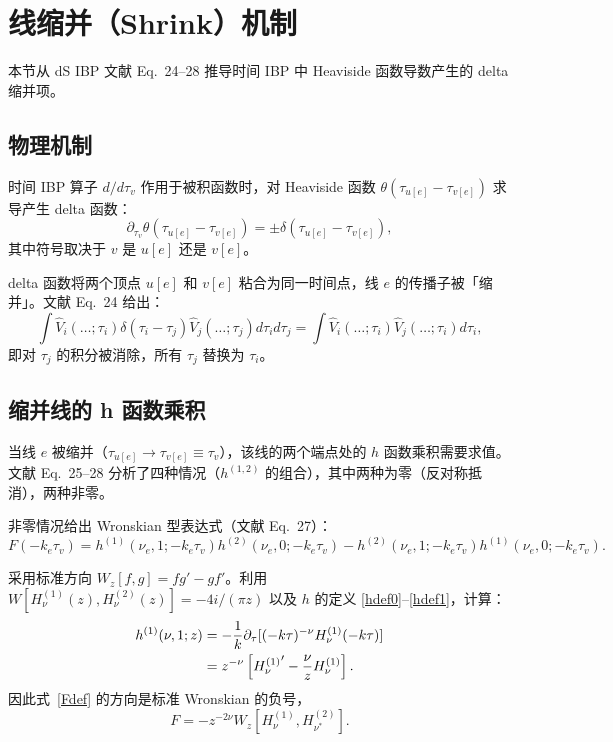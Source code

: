 ﻿\documentclass[a4paper,11pt]{article}
\begin{document}
\section{线缩并（Shrink）机制}

本节从 dS IBP 文献 Eq.~24--28 推导时间 IBP 中 Heaviside 函数导数产生的 delta 缩并项。

\subsection{物理机制}

时间 IBP 算子 $d/d\tau_v$ 作用于被积函数时，对 Heaviside 函数 $\theta(\tau_{u[e]} - \tau_{v[e]})$ 求导产生 delta 函数：
\begin{equation}
  \partial_{\tau_v} \theta(\tau_{u[e]} - \tau_{v[e]}) = \pm \delta(\tau_{u[e]} - \tau_{v[e]}),
  \label{thetaderiv}
\end{equation}
其中符号取决于 $v$ 是 $u[e]$ 还是 $v[e]$。

delta 函数将两个顶点 $u[e]$ 和 $v[e]$ 粘合为同一时间点，线 $e$ 的传播子被「缩并」。文献 Eq.~24 给出：
\begin{equation}
  \int \hat{V}_i(\ldots;\tau_i) \delta(\tau_i - \tau_j) \hat{V}_j(\ldots;\tau_j) d\tau_i d\tau_j = \int \hat{V}_i(\ldots;\tau_i) \hat{V}_j(\ldots;\tau_i) d\tau_i,
  \label{deltacollapse}
\end{equation}
即对 $\tau_j$ 的积分被消除，所有 $\tau_j$ 替换为 $\tau_i$。

\subsection{缩并线的 h 函数乘积}

当线 $e$ 被缩并（$\tau_{u[e]} \to \tau_{v[e]} \equiv \tau_v$），该线的两个端点处的 $h$ 函数乘积需要求值。文献 Eq.~25--28 分析了四种情况（$h^{(1,2)}$ 的组合），其中两种为零（反对称抵消），两种非零。

非零情况给出 Wronskian 型表达式（文献 Eq.~27）：
\begin{equation}
  F(-k_e\tau_v) = h^{(1)}(\nu_e, 1; -k_e\tau_v) h^{(2)}(\nu_e, 0; -k_e\tau_v) - h^{(2)}(\nu_e, 1; -k_e\tau_v) h^{(1)}(\nu_e, 0; -k_e\tau_v).
  \label{Fdef}
\end{equation}

采用标准方向 $W_z[f,g]=fg'-gf'$。利用 $W[H_\nu^{(1)}(z), H_\nu^{(2)}(z)] = -4i/(\pi z)$ 以及 $h$ 的定义 \eqref{hdef0}--\eqref{hdef1}，计算：
\begin{align}
  h^{(1)}(\nu, 1; z) &= -\frac{1}{k} \partial_\tau [(-k\tau)^{-\nu} H_\nu^{(1)}(-k\tau)] \notag \\
  &= z^{-\nu}\left[{H_\nu^{(1)}}'-\frac{\nu}{z}H_\nu^{(1)}\right].
\end{align}
因此式~\eqref{Fdef} 的方向是标准 Wronskian 的负号，
\begin{equation}
 F=-z^{-2\nu}W_z[H_\nu^{(1)},H_{\nu^*}^{(2)}].
 \label{FminusWronskian}
\end{equation}
\end{document}
